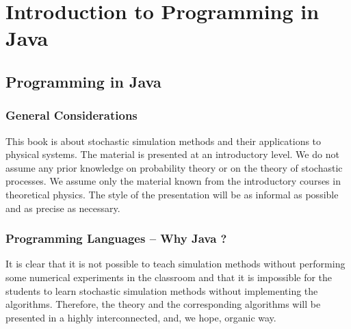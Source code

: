 
\chapter{Introduction to Programming in Java}
\label{chap:IntroJava}

\section{Programming in Java}
\label{sec:Programming}


\subsection{General Considerations}
\label{sec:General_considerations}
This book is about stochastic simulation methods and their applications to
physical systems. The material is presented at an introductory level. We do 
not assume any prior knowledge on probability theory or on the theory of 
stochastic processes. We assume only the material known from the introductory 
courses in theoretical physics. The style of the presentation will be as 
informal as possible and as precise as necessary.



\subsection{Programming Languages -- Why Java ?}
\label{sec:Programming_languages}
It is clear that it is not possible to teach simulation methods without 
performing some numerical experiments in the classroom and that it is 
impossible for the students to learn stochastic simulation methods without 
implementing the algorithms. Therefore, the theory and the corresponding 
algorithms will be presented in a highly interconnected, and, we 
hope, organic way.

